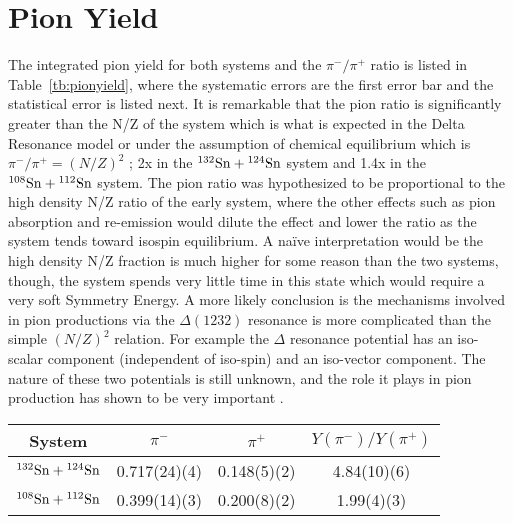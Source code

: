 \section{Pion Yield}

The integrated pion yield for both systems and the $\pi^-/\pi^+$ ratio is listed in Table~\ref{tb:pionyield}, where the systematic errors are the first error bar and the statistical error is listed next. It is remarkable that the pion ratio is significantly greater than the N/Z of the system which is what is expected in the Delta Resonance model or under the assumption of chemical equilibrium which is $\pi^-/\pi^+ = (N/Z)^2$ \cite{baoan_piprod1,baoan_piprod2}; 2x in the ${}^{132}\mathrm{Sn} + {}^{124}\mathrm{Sn}$ system and 1.4x in the ${}^{108}\mathrm{Sn} + {}^{112}\mathrm{Sn}$ system. The pion ratio was hypothesized to be proportional to the high density N/Z ratio of the early system, where the other effects such as pion absorption and re-emission would dilute the effect and lower the ratio as the system tends toward isospin equilibrium. A na\"ive interpretation would be the high density N/Z fraction is much higher for some reason than the two systems, though, the system spends very little time in this state which would require a very soft Symmetry Energy. A more likely conclusion is the mechanisms involved in pion productions via the $\Delta(1232)$ resonance is more complicated than the simple $(N/Z)^2$ relation. For example the $\Delta$ resonance potential has an iso-scalar component (independent of iso-spin) and an iso-vector component. The nature of these two potentials is still unknown, and the role it plays in pion production has shown to be very important \cite{baoan_deltapotential}.


\begin{table*}\centering
{}
\begin{tabular}{@{}cccc@{}}\toprule
System & $\pi^-$ & $\pi^+$ & $Y(\pi^-)/Y(\pi^+)$  \\
\midrule
${}^{132}\mathrm{Sn} + {}^{124}\mathrm{Sn}$ & 0.717(24)(4) & 0.148(5)(2) & 4.84(10)(6)  \\
${}^{108}\mathrm{Sn} + {}^{112}\mathrm{Sn}$ & 0.399(14)(3) & 0.200(8)(2) & 1.99(4)(3)  \\
\bottomrule
\end{tabular}
\caption{Total pion yield.}
\label{tb:pionyield}
\end{table*}



